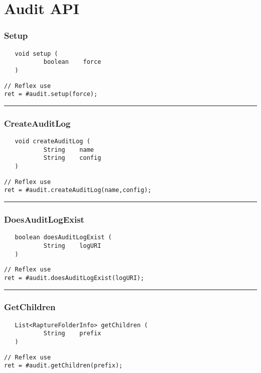 \section{Audit API}

\subsubsection{Setup}
\label{Api:Setup}
\begin{verbatim}
   void setup (
           boolean    force
   )
\end{verbatim}
\begin{lstlisting}[language=reflex]
// Reflex use
ret = #audit.setup(force);
\end{lstlisting}



\rule{15cm}{2pt}
\subsubsection{CreateAuditLog}
\label{Api:CreateAuditLog}
\begin{verbatim}
   void createAuditLog (
           String    name
           String    config
   )
\end{verbatim}
\begin{lstlisting}[language=reflex]
// Reflex use
ret = #audit.createAuditLog(name,config);
\end{lstlisting}



\rule{15cm}{2pt}
\subsubsection{DoesAuditLogExist}
\label{Api:DoesAuditLogExist}
\begin{verbatim}
   boolean doesAuditLogExist (
           String    logURI
   )
\end{verbatim}
\begin{lstlisting}[language=reflex]
// Reflex use
ret = #audit.doesAuditLogExist(logURI);
\end{lstlisting}



\rule{15cm}{2pt}
\subsubsection{GetChildren}
\label{Api:GetChildren}
\begin{verbatim}
   List<RaptureFolderInfo> getChildren (
           String    prefix
   )
\end{verbatim}
\begin{lstlisting}[language=reflex]
// Reflex use
ret = #audit.getChildren(prefix);
\end{lstlisting}



